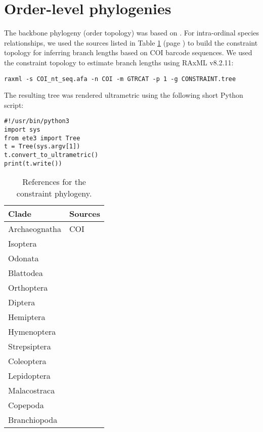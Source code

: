\clearpage

\section{Order-level phylogenies}

The backbone phylogeny (order topology) was based on \citet{Misof2014}. For intra-ordinal species relationships, we used the sources listed in Table \ref{tab:phylogeny-sources} (page \pageref{tab:phylogeny-sources}) to build the constraint topology for inferring branch lengths based on COI barcode sequences. We used the constraint topology to estimate branch lengths using RAxML v8.2.11:

\begin{verbatim}
raxml -s COI_nt_seq.afa -n COI -m GTRCAT -p 1 -g CONSTRAINT.tree
\end{verbatim}

\begin{minipage}{\linewidth}
The resulting tree was rendered ultrametric using the following short Python script:

\begin{verbatim}
#!/usr/bin/python3
import sys
from ete3 import Tree
t = Tree(sys.argv[1])
t.convert_to_ultrametric()
print(t.write())
\end{verbatim}
\end{minipage}


\begin{table}[h]
\centering
\caption[Literature sources for the constraint phylogeny]{References for the constraint phylogeny.}
\label{tab:phylogeny-sources}
\begin{tabular}{lp{25em}}
\toprule
Clade         & Sources \\
\midrule
Archaeognatha & COI \\
Isoptera      & \citet{Cameron2012} \\
Odonata       & \citet{Letsch2016} \\
Blattodea     & \citet{Wang2017}    \\
Orthoptera    & \citet{Zhang2013a}   \\
Diptera       & \citet{Wiegmann2011,Cranston2011} \\
Hemiptera     & \citet{Song2012,Ortiz-Rivas2010,Novakova2013} \\
Hymenoptera   & \citet{Peters2017,Branstetter2017,Ward2015} \\
Strepsiptera  & \citet{Pohl2005} \\
Coleoptera    & \citet{McKenna2015,Ahrens2014,Magro2010,Kergoat2014,Hundsdoerfer2009} \\
Lepidoptera   & \citet{Breinholt2018,Regier2013,Kawahara2009,Mitchell2005,Abraham2001} \\
\midrule
Malacostraca  & \citet{Tsang2008,Ahyong2004} \\
Copepoda      & \citet{Eyun2017a,Blanco-Bercial2011,Figueroa2011,Thum2004} \\
Branchiopoda  & \citet{Richter2007} \\
\bottomrule
\end{tabular}
\end{table}



